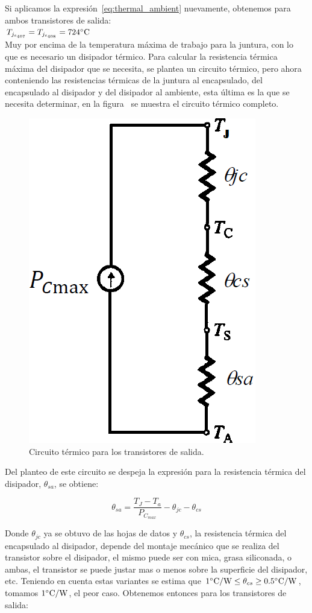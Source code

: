 Si aplicamos la expresión~\ref{eq:thermal_ambient} nuevamente, obtenemos para ambos transistores de salida:\\

$T_{j_{e_{407}}} = T_{j_{e_{408}}} =  724 \si[per-mode=symbol]{\celsius} $\\

Muy por encima de la temperatura máxima de trabajo para la juntura, con lo que es necesario un disipador térmico. Para calcular la resistencia térmica máxima del disipador que se necesita, se plantea un circuito térmico, pero ahora conteniendo las resistencias térmicas de la juntura al encapsulado, del encapsulado al disipador y del disipador al ambiente, esta última es la que se necesita determinar, en la figura~ se muestra el circuito térmico completo.


\begin{figure}[H] %
\begin{center}
\includegraphics[width=0.35 \textwidth, angle=0]{./img/desarrollo/thermal_circuit.png}
\caption{\label{fig:fig_thermal_circuit}\footnotesize{Circuito térmico para los transistores de salida.}}
\end{center}
\end{figure}

Del planteo de este circuito se despeja la expresión para la resistencia térmica del disipador, $\theta_{sa}$, se obtiene:

\begin{equation}
\theta_{sa} = \frac{T_{J} - T_{a}}{P_{C_{max}}} - \theta_{jc} - \theta_{cs}
\end{equation}


Donde $\theta_{jc}$ ya se obtuvo de las hojas de datos y $\theta_{cs}$, la resistencia térmica del encapsulado al disipador, depende del montaje mecánico que se realiza del transistor sobre el disipador, el mismo puede ser con mica, grasa siliconada, o ambas, el transistor se puede justar mas o menos sobre la superficie del disipador, etc. Teniendo en cuenta estas variantes se estima que $1 \si[per-mode=symbol]{\celsius\per\watt} \leq \theta_{cs} \geq 0.5 \si[per-mode=symbol]{\celsius\per\watt} $, tomamos $1 \si[per-mode=symbol]{\celsius\per\watt}$, el peor caso. Obtenemos entonces para los transistores de salida:

